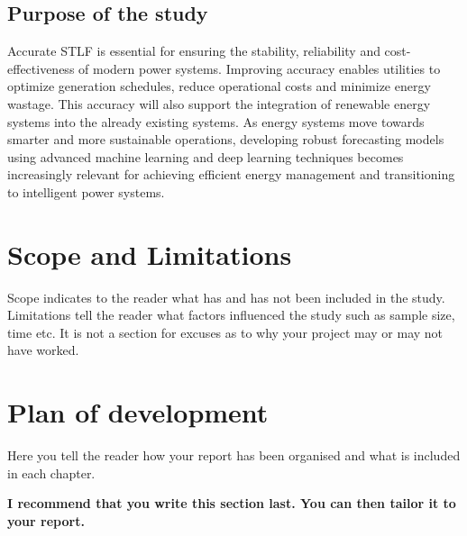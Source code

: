 \subsection{Purpose of the study}
Accurate STLF is essential for ensuring the stability, reliability and cost-effectiveness of modern power systems. Improving accuracy enables utilities to optimize generation schedules, reduce operational costs and minimize energy wastage. This accuracy will also support the integration of renewable energy systems into the already existing systems.
As energy systems move towards smarter and more sustainable operations, developing robust forecasting models using advanced machine learning and deep learning techniques becomes increasingly relevant for achieving efficient energy management and transitioning to intelligent power systems.
\section{Scope and Limitations}
Scope indicates to the reader what has and has not been included in the study. Limitations tell the
reader what factors influenced the study such as sample size, time etc. It is not a section for excuses as
to why your project may or may not have worked.

\section{Plan of development}
Here you tell the reader how your report has been organised and what is included in each
chapter.

{\bf I recommend that you write this section last. You can then tailor it to your report.}
